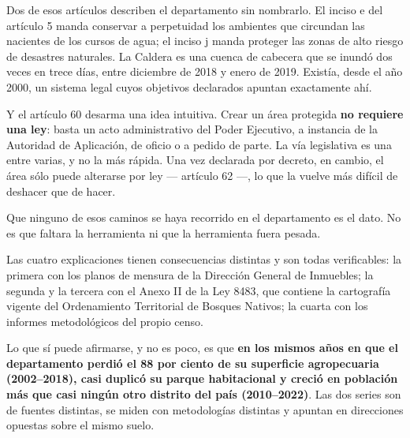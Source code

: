 \begin{cautela}
Dos de esos artículos describen el departamento sin nombrarlo. El inciso e del artículo 5 manda conservar a perpetuidad los ambientes que circundan las nacientes de los cursos de agua; el inciso j manda proteger las zonas de alto riesgo de desastres naturales. La Caldera es una cuenca de cabecera que se inundó dos veces en trece días, entre diciembre de 2018 y enero de 2019. Existía, desde el año 2000, un sistema legal cuyos objetivos declarados apuntan exactamente ahí.

Y el artículo 60 desarma una idea intuitiva. Crear un área protegida \textbf{no requiere una ley}: basta un acto administrativo del Poder Ejecutivo, a instancia de la Autoridad de Aplicación, de oficio o a pedido de parte. La vía legislativa es una entre varias, y no la más rápida. Una vez declarada por decreto, en cambio, el área sólo puede alterarse por ley --- artículo 62 ---, lo que la vuelve más difícil de deshacer que de hacer.

Que ninguno de esos caminos se haya recorrido en el departamento es el dato. No es que faltara la herramienta ni que la herramienta fuera pesada.
\end{cautela}

\begin{cautela}
Las cuatro explicaciones tienen consecuencias distintas y son todas verificables: la primera con los planos de mensura de la Dirección General de Inmuebles; la segunda y la tercera con el Anexo II de la Ley 8483, que contiene la cartografía vigente del Ordenamiento Territorial de Bosques Nativos; la cuarta con los informes metodológicos del propio censo.

Lo que sí puede afirmarse, y no es poco, es que \textbf{en los mismos años en que el departamento perdió el 88 por ciento de su superficie agropecuaria (2002--2018), casi duplicó su parque habitacional y creció en población más que casi ningún otro distrito del país (2010--2022)}. Las dos series son de fuentes distintas, se miden con metodologías distintas y apuntan en direcciones opuestas sobre el mismo suelo.
\end{cautela}

